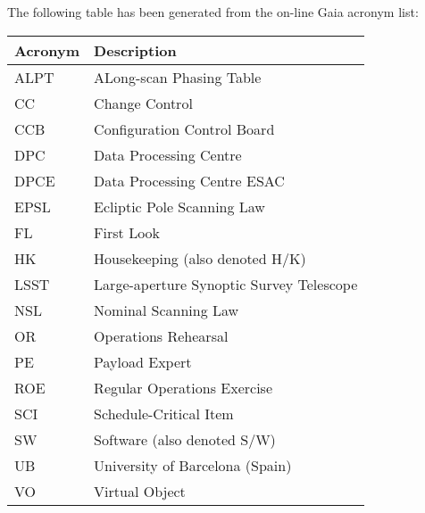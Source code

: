 The following table has been generated from the on-line Gaia acronym list:
\newline\newline%
\addtocounter{table}{-1}
\begin{longtable}{|l|p{}|}\hline 
\textbf{Acronym} & \textbf{Description}  \\\hline
ALPT&ALong-scan Phasing Table \\\hline
CC&Change Control \\\hline
CCB&Configuration Control Board \\\hline
DPC&Data Processing Centre \\\hline
DPCE&Data Processing Centre ESAC \\\hline
EPSL&Ecliptic Pole Scanning Law \\\hline
FL&First Look \\\hline
HK&Housekeeping (also denoted H/K) \\\hline
LSST&Large-aperture Synoptic Survey Telescope \\\hline
NSL&Nominal Scanning Law \\\hline
OR&Operations Rehearsal \\\hline
PE&Payload Expert \\\hline
ROE&Regular Operations Exercise \\\hline
SCI&Schedule-Critical Item \\\hline
SW&Software (also denoted S/W) \\\hline
UB&University of Barcelona (Spain) \\\hline
VO&Virtual Object \\\hline
\end{longtable} 
